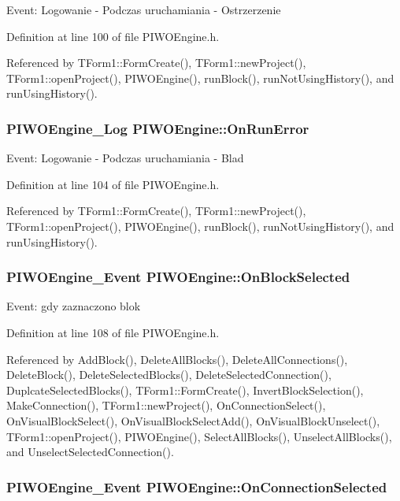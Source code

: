 Event: Logowanie - Podczas uruchamiania - Ostrzerzenie 

Definition at line 100 of file PIWOEngine.h.

Referenced by TForm1::FormCreate(), TForm1::newProject(), TForm1::openProject(), PIWOEngine(), runBlock(), runNotUsingHistory(), and runUsingHistory().\hypertarget{classPIWOEngine_303f960016f76986cba65e2c0aaea4e1}{
\subsubsection[OnRunError]{\setlength{\rightskip}{0pt plus 5cm}PIWOEngine\_\-Log {\bf PIWOEngine::OnRunError}}}
\label{classPIWOEngine_303f960016f76986cba65e2c0aaea4e1}


Event: Logowanie - Podczas uruchamiania - Blad 

Definition at line 104 of file PIWOEngine.h.

Referenced by TForm1::FormCreate(), TForm1::newProject(), TForm1::openProject(), PIWOEngine(), runBlock(), runNotUsingHistory(), and runUsingHistory().\hypertarget{classPIWOEngine_ed5f12ba5e4872c5326126080a2cd821}{
\subsubsection[OnBlockSelected]{\setlength{\rightskip}{0pt plus 5cm}PIWOEngine\_\-Event {\bf PIWOEngine::OnBlockSelected}}}
\label{classPIWOEngine_ed5f12ba5e4872c5326126080a2cd821}


Event: gdy zaznaczono blok 

Definition at line 108 of file PIWOEngine.h.

Referenced by AddBlock(), DeleteAllBlocks(), DeleteAllConnections(), DeleteBlock(), DeleteSelectedBlocks(), DeleteSelectedConnection(), DuplcateSelectedBlocks(), TForm1::FormCreate(), InvertBlockSelection(), MakeConnection(), TForm1::newProject(), OnConnectionSelect(), OnVisualBlockSelect(), OnVisualBlockSelectAdd(), OnVisualBlockUnselect(), TForm1::openProject(), PIWOEngine(), SelectAllBlocks(), UnselectAllBlocks(), and UnselectSelectedConnection().\hypertarget{classPIWOEngine_45e9d4a676e2c489718b23491af65206}{
\subsubsection[OnConnectionSelected]{\setlength{\rightskip}{0pt plus 5cm}PIWOEngine\_\-Event {\bf PIWOEngine::OnConnectionSelected}}}
\label{classPIWOEngine_45e9d4a676e2c489718b23491af65206}


